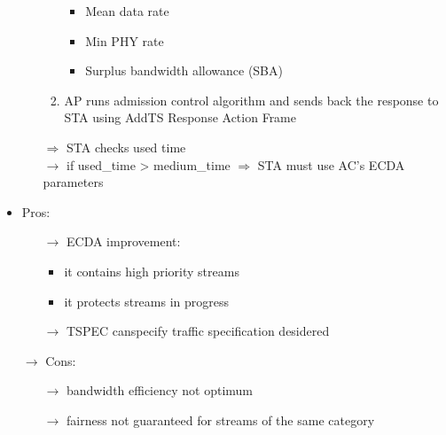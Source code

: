 \begin{itemize}
\begin{itemize}
\begin{enumerate}
\begin{itemize}
            \item Mean data rate
            \item Min PHY rate
            \item Surplus bandwidth allowance (SBA)
           \end{itemize}
           \item AP runs admission control algorithm and sends back the response to
           \hspace*{-0.3cm}STA using AddTS Response Action Frame
        \end{enumerate}
        $\Rightarrow$ STA checks used time\\
        $\rightarrow$ if used\_time > medium\_time $\Rightarrow$ STA must use AC's ECDA parameters
    \end{itemize}
    \item Pros:
    \begin{itemize}
        \item[$\rightarrow$] ECDA improvement:
        \begin{itemize}
            \item it contains high priority streams
            \item it protects streams in progress 
        \end{itemize}
        \item[$\rightarrow$] TSPEC canspecify traffic specification desidered
    \end{itemize}
    \item[$\rightarrow$] Cons:
    \begin{itemize}
        \item[$\rightarrow$] bandwidth efficiency not optimum
        \item[$\rightarrow$] fairness not guaranteed for streams of the same category
    \end{itemize} 
\end{itemize}
